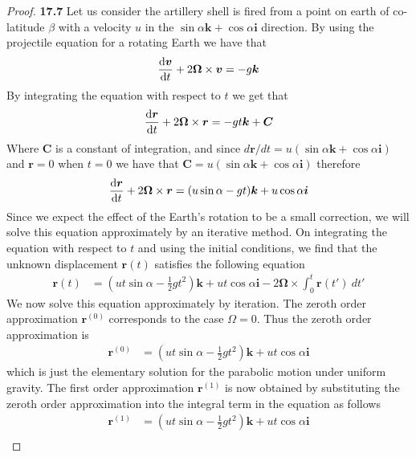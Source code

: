 \documentclass[11pt]{article}
\theoremstyle{definition}
\begin{document}
\begin{proof}{\textbf{17.7}}
    Let us consider the artillery shell is fired from a point on earth of
    co-latitude $\beta$ with a velocity $u$ in the
    $\sin\alpha\bm{k} + \cos\alpha \bm{i}$ direction.
    By using the projectile equation for a rotating Earth we have that
    \begin{align*}
        \derivative{\bm v}{t} + 2\bm{\Omega}\times \bm v = -g\bm{k}
    \end{align*}
    By integrating the equation with respect to $t$ we get that
    \begin{align*}
        \derivative{\bm r}{t} + 2\bm{\Omega}\times \bm{r} = -gt\bm{k}  + \bm{C}
    \end{align*}
    Where $\bm{C}$ is a constant of integration, and since
    $d\bm{r}/dt = u(\sin\alpha\bm{k} + \cos\alpha \bm{i})$ and $\bm{r} = 0$ when $t = 0$ we have that
    $\bm{C} = u(\sin\alpha\bm{k} + \cos\alpha \bm{i})$ therefore
    \begin{align*}
        \derivative{\bm r}{t} + 2\bm{\Omega}\times \bm{r}
        = (u\sin\alpha - gt)\bm{k} + u\cos\alpha \bm{i}
    \end{align*}
    Since we expect the effect of the Earth's rotation to be a small correction,
    we will solve this equation approximately by an iterative method.
    On integrating the equation with respect to $t$ and using the 
    initial conditions, we ﬁnd that the unknown displacement $\bm{r}(t)$
    satisﬁes the following equation
    \begin{align*}
        \bm r(t)
        &= (ut\sin\alpha - \frac{1}{2}gt^2)\bm{k} + ut\cos\alpha \bm{i}  
        - 2\bm{\Omega}\times \int_0^t \bm{r}(t')~dt'
    \end{align*}
    We now solve this equation approximately by iteration. The zeroth order
    approximation $\bm{r}^{(0)}$ corresponds to the case $\Omega = 0$. Thus
    the zeroth order approximation is
    \begin{align*}
        \bm r^{(0)} &= (ut\sin\alpha - \frac{1}{2}gt^2)\bm{k} + ut\cos\alpha \bm{i}
    \end{align*}
    which is just the elementary solution for the parabolic motion under
    uniform gravity.
    The ﬁrst order approximation $\bm{r}^{(1)}$ is now obtained
    by substituting the zeroth order approximation into the integral term in
    the equation as follows
    \begin{align*}
        \bm r^{(1)}
        &= (ut\sin\alpha - \frac{1}{2}gt^2)\bm{k} + ut\cos\alpha \bm{i} \\

\end{align*}
\end{proof}
\end{document}
